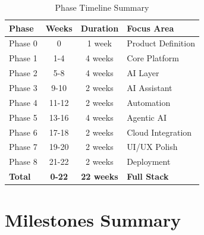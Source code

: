 \documentclass[12pt,oneside]{report}
\begin{document}
\vspace{0.5cm}

\begin{table}[h]
\centering
\caption{Phase Timeline Summary}
\begin{tabular}{|l|c|c|l|}
\hline
\rowcolor{lightblue}
\textbf{Phase} & \textbf{Weeks} & \textbf{Duration} & \textbf{Focus Area} \\
\hline
Phase 0 & 0 & 1 week & Product Definition \\
Phase 1 & 1-4 & 4 weeks & Core Platform \\
Phase 2 & 5-8 & 4 weeks & AI Layer \\
Phase 3 & 9-10 & 2 weeks & AI Assistant \\
Phase 4 & 11-12 & 2 weeks & Automation \\
Phase 5 & 13-16 & 4 weeks & Agentic AI \\
Phase 6 & 17-18 & 2 weeks & Cloud Integration \\
Phase 7 & 19-20 & 2 weeks & UI/UX Polish \\
Phase 8 & 21-22 & 2 weeks & Deployment \\
\hline
\textbf{Total} & \textbf{0-22} & \textbf{22 weeks} & \textbf{Full Stack} \\
\hline
\end{tabular}
\end{table}

\chapter{Milestones Summary}
\end{document}
